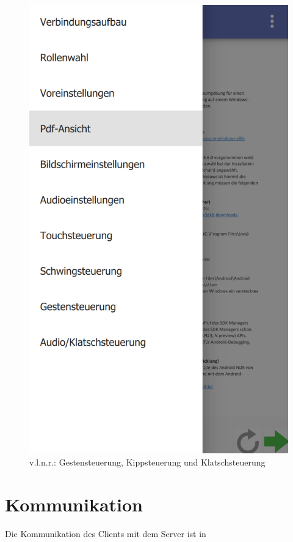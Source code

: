 \begin{figure}[ht!]
\begin{minipage}{0.31\linewidth}
		\includegraphics[scale=0.5]{GUI/Bilder/6_Menu-Button_Drawer_mit_Listview.PNG}
	\end{minipage}
	\caption{v.l.n.r.: Gestensteuerung, Kippsteuerung und Klatschsteuerung{\tiny}}
	\label{client:InformationenBedienhilfen}
\end{figure}



\section{Kommunikation}
Die Kommunikation des Clients mit dem Server ist in 
